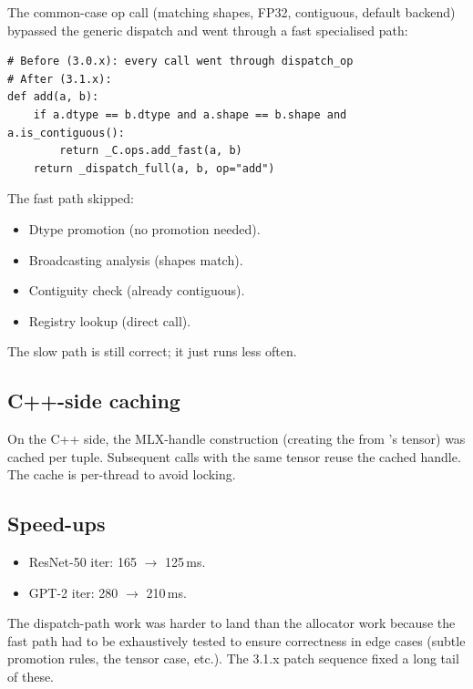 The common-case op call (matching shapes, FP32, contiguous,
default backend) bypassed the generic dispatch and went through
a fast specialised path:

\begin{lstlisting}[style=lucid,language=LucidPython]
# Before (3.0.x): every call went through dispatch_op
# After (3.1.x):
def add(a, b):
    if a.dtype == b.dtype and a.shape == b.shape and a.is_contiguous():
        return _C.ops.add_fast(a, b)
    return _dispatch_full(a, b, op="add")
\end{lstlisting}

The fast path skipped:
\begin{itemize}
  \item Dtype promotion (no promotion needed).
  \item Broadcasting analysis (shapes match).
  \item Contiguity check (already contiguous).
  \item Registry lookup (direct call).
\end{itemize}

The slow path is still correct; it just runs less often.

\subsection{C++-side caching}
\label{ssec:stabilization:cpp_caching}

On the C++ side, the MLX-handle construction (creating the
 from \Lucid's tensor) was cached per
 tuple. Subsequent
calls with the same tensor reuse the cached handle. The cache
is per-thread to avoid locking.

\subsection{Speed-ups}
\label{ssec:stabilization:phase_3_speedups}

\begin{itemize}
  \item ResNet-50 iter: 165 $\to$ 125\,ms.
  \item GPT-2 iter: 280 $\to$ 210\,ms.
\end{itemize}

The dispatch-path work was harder to land than the allocator
work because the fast path had to be exhaustively tested to
ensure correctness in edge cases (subtle promotion rules, the
 tensor case, etc.). The 3.1.x patch sequence
fixed a long tail of these.

